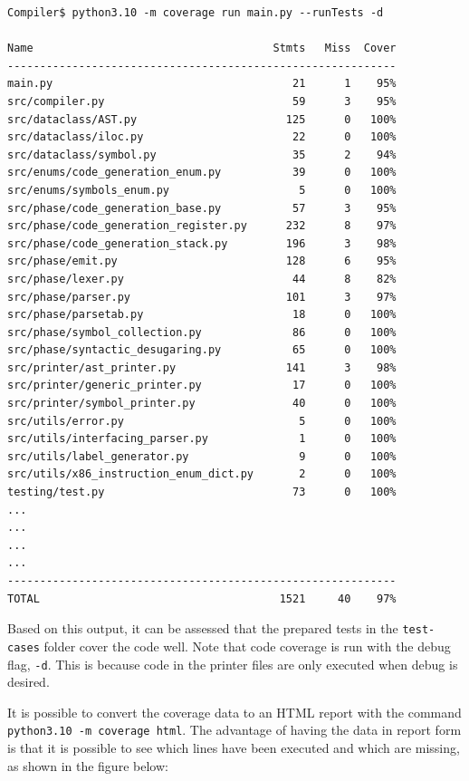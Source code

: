 \begin{verbatim}
Compiler$ python3.10 -m coverage run main.py --runTests -d

Name                                     Stmts   Miss  Cover
------------------------------------------------------------
main.py                                     21      1    95%
src/compiler.py                             59      3    95%
src/dataclass/AST.py                       125      0   100%
src/dataclass/iloc.py                       22      0   100%
src/dataclass/symbol.py                     35      2    94%
src/enums/code_generation_enum.py           39      0   100%
src/enums/symbols_enum.py                    5      0   100%
src/phase/code_generation_base.py           57      3    95%
src/phase/code_generation_register.py      232      8    97%
src/phase/code_generation_stack.py         196      3    98%
src/phase/emit.py                          128      6    95%
src/phase/lexer.py                          44      8    82%
src/phase/parser.py                        101      3    97%
src/phase/parsetab.py                       18      0   100%
src/phase/symbol_collection.py              86      0   100%
src/phase/syntactic_desugaring.py           65      0   100%
src/printer/ast_printer.py                 141      3    98%
src/printer/generic_printer.py              17      0   100%
src/printer/symbol_printer.py               40      0   100%
src/utils/error.py                           5      0   100%
src/utils/interfacing_parser.py              1      0   100%
src/utils/label_generator.py                 9      0   100%
src/utils/x86_instruction_enum_dict.py       2      0   100%
testing/test.py                             73      0   100%
... 
... 
... 
...
------------------------------------------------------------
TOTAL                                     1521     40    97%
\end{verbatim}

Based on this output, it can be assessed that the prepared tests in the \texttt{test-cases} folder cover the code well. Note that code coverage is run with the debug flag, \texttt{-d}. This is because code in the printer files are only executed when debug is desired.

It is possible to convert the coverage data to an HTML report with the command \texttt{python3.10 -m coverage html}. The advantage of having the data in report form is that it is possible to see which lines have been executed and which are missing, as shown in the figure below: 

